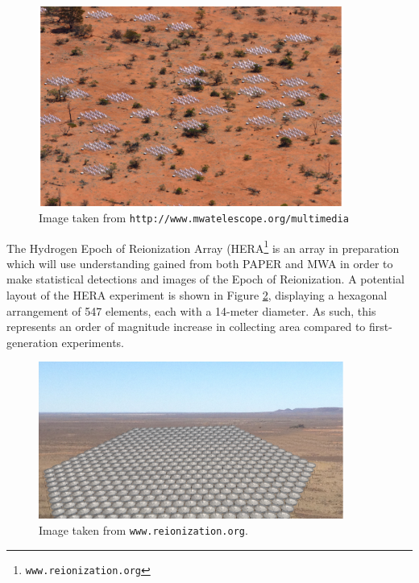 \begin{figure}[h]
  \centering
  \includegraphics[width=10cm]{MWA.eps}
  \caption{Image taken from {\tt http://www.mwatelescope.org/multimedia} }
  \label{fig:MWA}
\end{figure}


The Hydrogen Epoch of Reionization Array (HERA\footnote{{\tt www.reionization.org}} is an array in preparation which will use understanding gained from both PAPER and MWA in order to make statistical detections and images of the Epoch of Reionization. A potential layout of the HERA experiment is shown in Figure \ref{fig:HERA}, displaying a hexagonal arrangement of 547 elements, each with a 14-meter diameter. As such, this represents an order of magnitude increase in collecting area compared to first-generation experiments.

\begin{figure}[h]
  \centering
  \includegraphics[width=10cm]{HERA.eps}
  \caption{Image taken from {\tt www.reionization.org}.}
  \label{fig:HERA}
\end{figure}

